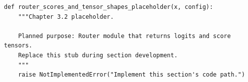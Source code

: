 \begin{lstlisting}[style=bookpython,caption={Planned code placeholder for router scores and tensor shapes.},label={lst:ch03-router-scores-and-tensor-shapes}]
def router_scores_and_tensor_shapes_placeholder(x, config):
    """Chapter 3.2 placeholder.

    Planned purpose: Router module that returns logits and score tensors.
    Replace this stub during section development.
    """
    raise NotImplementedError("Implement this section's code path.")
\end{lstlisting}
